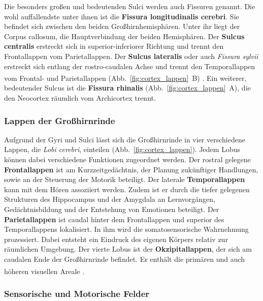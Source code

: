\noindent Die besonders großen und bedeutenden Sulci werden auch Fissuren genannt. Die wohl auffallendste unter ihnen ist die \textbf{Fissura longitudinalis cerebri}. Sie befindet sich zwischen den beiden Großhirnhemisphären. Unter ihr liegt der Corpus callosum, die Hauptverbindung der beiden Hemisphären. Der \textbf{Sulcus centralis} erstreckt sich in superior-inferiorer Richtung und trennt den Frontallappen vom Parietallappen. Der \textbf{Sulcus lateralis} oder auch \textit{Fissura sylvii} erstreckt sich entlang der rostro-caudalen Achse und trennt den Temporallappen vom Frontal- und Parietallappen (Abb.~\ref{fig:cortex_lappen}~B) \textsuperscript{\cite[Kap.~7]{neurowissenschaften_baer}}. Ein weiterer, bedeutender Sulcus ist die \textbf{Fissura rhinalis} (Abb.~\ref{fig:cortex_lappen}~A), die den Neocortex räumlich vom Archicortex trennt. 

\subsubsection*{Lappen der Großhirnrinde}

Aufgrund der Gyri und Sulci lässt sich die Großhirnrinde in vier verschiedene Lappen, die \textit{Lobi cerebri}, einteilen (Abb.~\ref{fig:cortex_lappen}). Jedem Lobus können dabei verschiedene Funktionen zugeordnet werden. Der rostral gelegene \textbf{Frontallappen} ist am Kurzzeitgedächtnis, der Planung zukünftiger Handlungen, sowie an der Steuerung der Motorik beteiligt. Der laterale \textbf{Temporallappen} kann mit dem Hören assoziiert werden. Zudem ist er durch die tiefer gelegenen Strukturen des Hippocampus und der Amygdala an Lernvorgängen, Gedächtnisbildung und der Entstehung von Emotionen beteiligt. Der \textbf{Parietallappen} ist caudal hinter dem Frontallappen und superior des Temporallappens lokalisiert. In ihm wird die somatosensorische Wahrnehmung prozessiert. Dabei entsteht ein Eindruck des eigenen Körpers relativ zur räumlichen Umgebung. Der vierte Lobus ist der \textbf{Okzipitallappen}, der sich am caudalen Ende der Großhirnrinde befindet. Er enthält die primären und auch höheren visuellen Areale \textsuperscript{\cite[Kap.~1]{kandel2013principles}}.

\subsubsection*{Sensorische und Motorische Felder}
\label{subsubsec:Sens_Mot_Felder}

